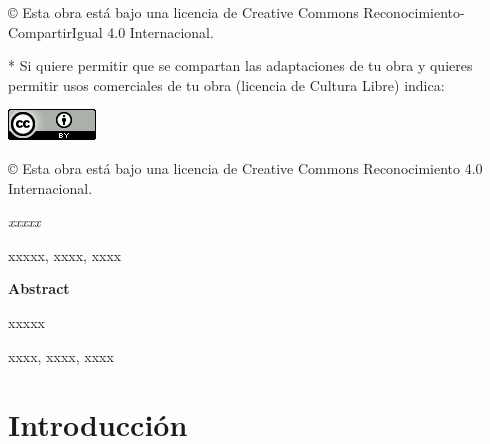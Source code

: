 \documentclass[spanish,a4paper,12pt,oneside]{scrbook}
\newenvironment{abstract}
{\par\noindent\begin{center}\textbf{\abstractname}\end{center}\begin{itshape}\par\noindent}
{\end{itshape}}
\newenvironment{summary}
{\par\noindent\begin{center}\textbf{Abstract}\end{center}\begin{itshape}\par\noindent}
{\end{itshape}}
\newenvironment{keywords}
{\begin{list}{}{\setlength{\leftmargin}{1em}}\item[\hskip\labelsep \bfseries Keywords:]}
{\end{list}}
\newenvironment{palabrasClave}
{\begin{list}{}{\setlength{\leftmargin}{1em}}\item[\hskip\labelsep \bfseries Palabras clave:]}
{\end{list}}
\begin{document}
\begin{large}
© Esta obra está bajo una licencia de Creative Commons Reconocimiento-CompartirIgual 4.0 Internacional.
\end{large}

\bigskip
\bigskip
\bigskip
* Si quiere permitir que se compartan las adaptaciones de tu obra y quieres permitir usos comerciales de tu obra (licencia de Cultura Libre) indica:

\begin{center}
\includegraphics[scale=1.8]{images/by_88x31}\\[5mm]
\end{center}

\begin{large}
© Esta obra está bajo una licencia de Creative Commons Reconocimiento 4.0 Internacional.
\end{large}

\thispagestyle{empty}
\vspace*{200px}

\begin{abstract}
{\em
xxxxx
}

\begin{palabrasClave}
xxxxx, xxxx, xxxx
\end{palabrasClave}

\end{abstract}
\thispagestyle{empty}
\vspace*{200px}

\begin{summary}
{
xxxxx
}

\begin {keywords}
xxxx, xxxx, xxxx
\end {keywords}

\end{summary}

\cleardoublepage
\setcounter{page}{1} 

\tableofcontents
\listoffigures
\listoftables

\mainmatter

\chapter{Introducción}
\label{chapter:intro}
\end{document}
